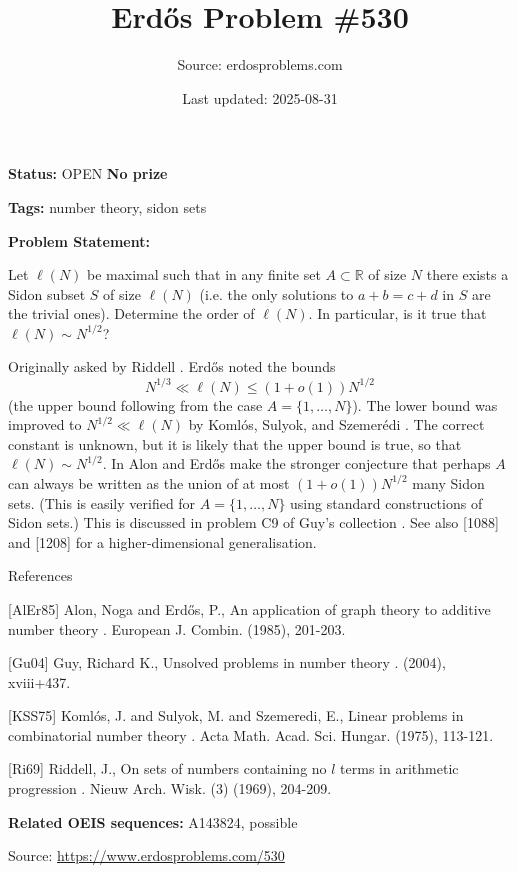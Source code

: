 \documentclass{article}
\title{Erd\H{o}s Problem \#530}
\date{Last updated: 2025-08-31}
\author{Source: erdosproblems.com}
\begin{document}
\maketitle

\noindent\textbf{Status:} OPEN \quad \textbf{No prize}

\noindent\textbf{Tags:} number theory, sidon sets

\medskip

\noindent\textbf{Problem Statement:}

Let $\ell(N)$ be maximal such that in any finite set $A\subset \mathbb{R}$ of size $N$ there exists a Sidon subset $S$ of size $\ell(N)$ (i.e. the only solutions to $a+b=c+d$ in $S$ are the trivial ones). Determine the order of $\ell(N)$. In particular, is it true that $\ell(N)\sim N^{1/2}$?




Originally asked by Riddell \cite{Ri69}. Erd\H{o}s noted the bounds\[N^{1/3} \ll \ell(N) \leq (1+o(1))N^{1/2}\](the upper bound following from the case $A=\{1,\ldots,N\}$). The lower bound was improved to $N^{1/2}\ll \ell(N)$ by Koml\'{o}s, Sulyok, and Szemer\'{e}di \cite{KSS75}. The correct constant is unknown, but it is likely that the upper bound is true, so that $\ell(N)\sim N^{1/2}$. In \cite{AlEr85} Alon and Erd\H{o}s make the stronger conjecture that perhaps $A$ can always be written as the union of at most $(1+o(1))N^{1/2}$ many Sidon sets. (This is easily verified for $A=\{1,\ldots,N\}$ using standard constructions of Sidon sets.) This is discussed in problem C9 of Guy's collection \cite{Gu04}. See also [1088] and [1208] for a higher-dimensional generalisation.




References

[AlEr85] Alon, Noga and Erd\H{o}s, P., An application of graph theory to additive number theory . European J. Combin. (1985), 201-203.

[Gu04] Guy, Richard K., Unsolved problems in number theory . (2004), xviii+437.

[KSS75] Koml\'{o}s, J. and Sulyok, M. and Szemeredi, E., Linear problems in combinatorial number theory . Acta Math. Acad. Sci. Hungar. (1975), 113-121.

[Ri69] Riddell, J., On sets of numbers containing no $l$ terms in arithmetic progression . Nieuw Arch. Wisk. (3) (1969), 204-209.

\noindent\textbf{Related OEIS sequences:} A143824, possible


\bigskip
\noindent\small{Source: \url{https://www.erdosproblems.com/530}}
\end{document}
